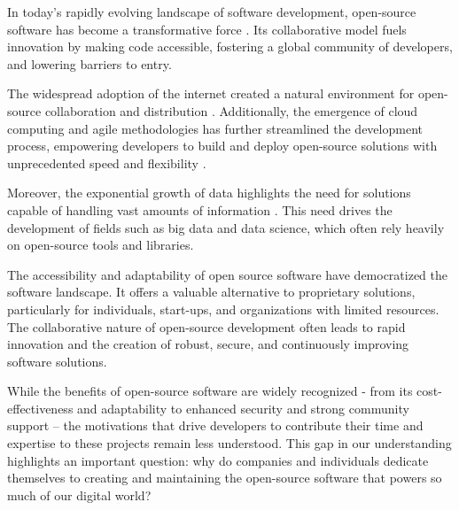 

In today's rapidly evolving landscape of software development, open-source software has become a transformative force \cite{fitzgerald2006transformation}. Its collaborative model fuels innovation by making code accessible, fostering a global community of developers, and lowering barriers to entry. 

The widespread adoption of the internet created a natural environment for open-source collaboration and distribution \cite{schweik2012internet}. Additionally, the emergence of cloud computing and agile methodologies has further streamlined the development process, empowering developers to build and deploy open-source solutions with unprecedented speed and flexibility \cite{raj2013envisioning}.

Moreover, the exponential growth of data highlights the need for solutions capable of handling vast amounts of information \cite{berman2013principles}. This need drives the development of fields such as big data and data science, which often rely heavily on open-source tools and libraries.

The accessibility and adaptability of open source software have democratized the software landscape. It offers a valuable alternative to proprietary solutions, particularly for individuals, start-ups, and organizations with limited resources. The collaborative nature of open-source development often leads to rapid innovation and the creation of robust, secure, and continuously improving software solutions.

While the benefits of open-source software are widely recognized - from its cost-effectiveness and adaptability to enhanced security and strong community support – the motivations that drive developers to contribute their time and expertise to these projects remain less understood.  This gap in our understanding highlights an important question: why do companies and individuals dedicate themselves to creating and maintaining the open-source software that powers so much of our digital world?

